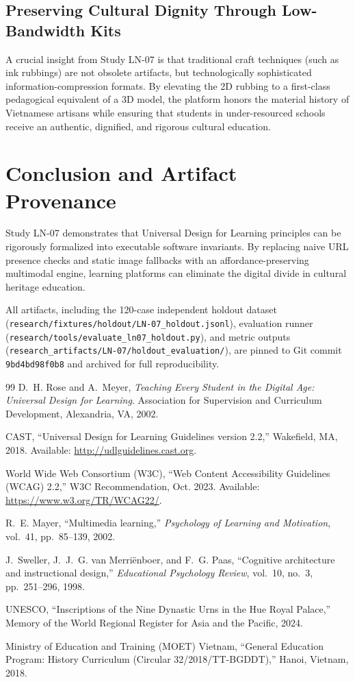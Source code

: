 \documentclass[11pt,a4paper]{article}
\begin{document}
\subsection{Preserving Cultural Dignity Through Low-Bandwidth Kits}
A crucial insight from Study LN-07 is that traditional craft techniques (such as ink rubbings) are not obsolete artifacts, but technologically sophisticated information-compression formats. By elevating the 2D rubbing to a first-class pedagogical equivalent of a 3D model, the platform honors the material history of Vietnamese artisans while ensuring that students in under-resourced schools receive an authentic, dignified, and rigorous cultural education.

\section{Conclusion and Artifact Provenance}

Study LN-07 demonstrates that Universal Design for Learning principles can be rigorously formalized into executable software invariants. By replacing naive URL presence checks and static image fallbacks with an affordance-preserving multimodal engine, learning platforms can eliminate the digital divide in cultural heritage education.

All artifacts, including the 120-case independent holdout dataset (\texttt{research/fixtures/holdout/LN-07\_holdout.jsonl}), evaluation runner (\texttt{research/tools/evaluate\_ln07\_holdout.py}), and metric outputs (\texttt{research\_artifacts/LN-07/holdout\_evaluation/}), are pinned to Git commit \texttt{9bd4bd98f0b8} and archived for full reproducibility.

\begin{thebibliography}{99}
D.~H. Rose and A.~Meyer, \emph{Teaching Every Student in the Digital Age: Universal Design for Learning}. Association for Supervision and Curriculum Development, Alexandria, VA, 2002.

CAST, ``Universal Design for Learning Guidelines version 2.2,'' Wakefield, MA, 2018. Available: \url{http://udlguidelines.cast.org}.

World Wide Web Consortium (W3C), ``Web Content Accessibility Guidelines (WCAG) 2.2,'' W3C Recommendation, Oct. 2023. Available: \url{https://www.w3.org/TR/WCAG22/}.

R.~E. Mayer, ``Multimedia learning,'' \emph{Psychology of Learning and Motivation}, vol.~41, pp.~85--139, 2002.

J.~Sweller, J.~J.~G. van Merri\"{e}nboer, and F.~G. Paas, ``Cognitive architecture and instructional design,'' \emph{Educational Psychology Review}, vol.~10, no.~3, pp.~251--296, 1998.

UNESCO, ``Inscriptions of the Nine Dynastic Urns in the Hue Royal Palace,'' Memory of the World Regional Register for Asia and the Pacific, 2024.

Ministry of Education and Training (MOET) Vietnam, ``General Education Program: History Curriculum (Circular 32/2018/TT-BGDDT),'' Hanoi, Vietnam, 2018.
\end{thebibliography}
\end{document}
